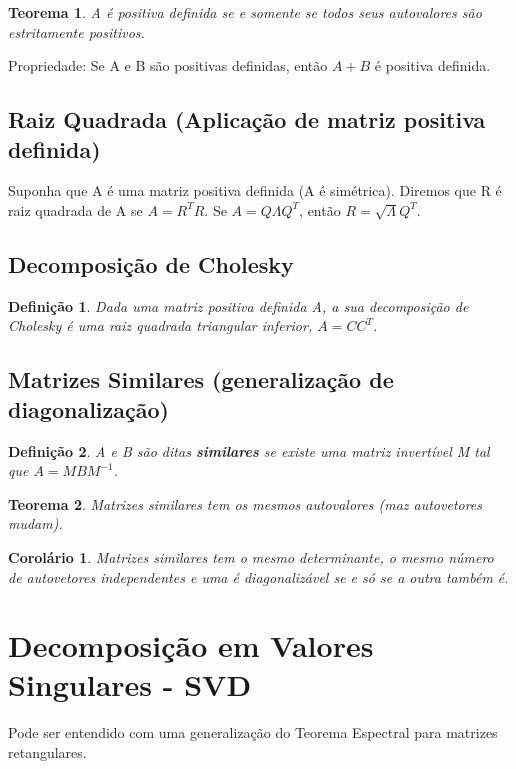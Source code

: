 \documentclass[12pt]{article}
\newtheorem{theorem}{Teorema}
\newtheorem{corollary}{Corolário}[theorem]
\newtheorem{definition}{Definição}
\begin{document}
\begin{theorem}
    A é positiva definida se e somente se todos seus autovalores são estritamente positivos.
\end{theorem}

Propriedade: Se A e B são positivas definidas, então $A + B$ é positiva definida.

\subsection*{Raiz Quadrada (Aplicação de matriz positiva definida)}
Suponha que A é uma matriz positiva definida (A é simétrica). Diremos que R é raiz quadrada de A se $A = R^T R$. Se $A = Q \Lambda Q^T$, então $R = \sqrt{\Lambda} Q^T$.

\subsection*{Decomposição de Cholesky}
\begin{definition}
    Dada uma matriz positiva definida A, a sua decomposição de Cholesky é uma raiz quadrada triangular inferior, $A = C C^T$.
\end{definition}

\subsection*{Matrizes Similares (generalização de diagonalização)}
\begin{definition}
    A e B são ditas \textbf{similares} se existe uma matriz invertível M tal que $A = M B M^{-1}$.
\end{definition}

\begin{theorem}
    Matrizes similares tem os mesmos autovalores (maz autovetores mudam).
\end{theorem}

\begin{corollary}
    Matrizes similares tem o mesmo determinante, o mesmo número de autovetores independentes e uma é diagonalizável se e só se a outra também é.
\end{corollary}

\section*{Decomposição em Valores Singulares - SVD}
\label{s4}
Pode ser entendido com uma generalização do Teorema Espectral para matrizes retangulares.
\end{document}
